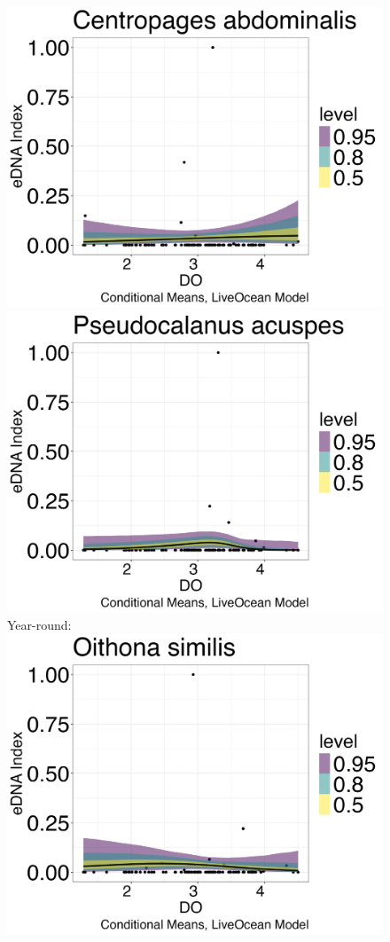 \documentclass[12pt,twoside]{reedthesis}
\begin{document}
\begin{figure}[h]
\begin{center}
			\includegraphics[scale=0.25]{Cabdominalis_ZOIB_Means_Mod_noOut}
			\includegraphics[scale=0.25]{Pacuspes_ZOIB_Means_Mod_noOut} \\
			Year-round: \\
			\includegraphics[scale=0.25]{Osimilis_ZOIB_Means_Mod_noOut} \\

\end{center}
\end{figure}
\end{document}
